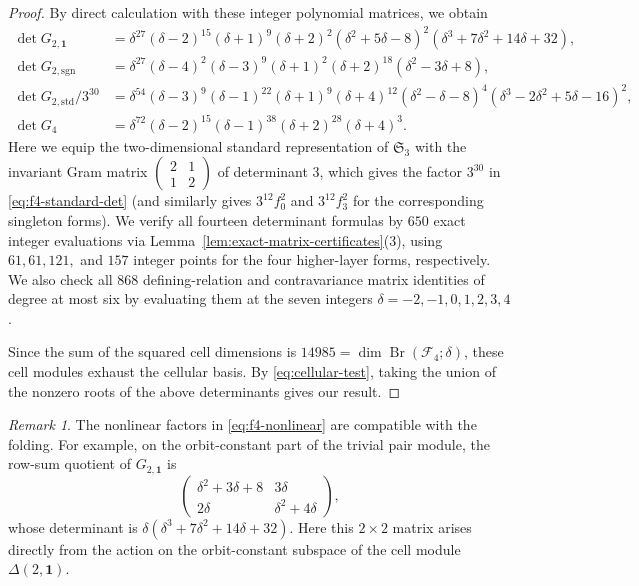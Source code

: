 \documentclass[11pt,a4paper]{amsart}
\newcommand{\Br}{\operatorname{Br}}\newcommand{\Irr}{\operatorname{Irr}}
\theoremstyle{uprightdefinition}
\theoremstyle{remark}\newtheorem{remark}[theorem]{Remark}
\begin{document}
\begin{proof}
By direct calculation with these integer polynomial matrices, we obtain
\begin{align}
\det G_{2,\mathbf1}
 &=\delta^{27}(\delta-2)^{15}(\delta+1)^9(\delta+2)^2
       (\delta^2+5\delta-8)^2
       (\delta^3+7\delta^2+14\delta+32),\label{eq:f4-trivial-det}\\
\det G_{2,\mathrm{sgn}}
 &=\delta^{27}(\delta-4)^2(\delta-3)^9(\delta+1)^2
       (\delta+2)^{18}(\delta^2-3\delta+8),\label{eq:f4-sign-det}\\
\det G_{2,\mathrm{std}}/3^{30}
 &=\delta^{54}(\delta-3)^9(\delta-1)^{22}(\delta+1)^9(\delta+4)^{12}
       (\delta^2-\delta-8)^4
       (\delta^3-2\delta^2+5\delta-16)^2,\label{eq:f4-standard-det}\\
\det G_4
 &=\delta^{72}(\delta-2)^{15}(\delta-1)^{38}
       (\delta+2)^{28}(\delta+4)^3.\label{eq:f4-four-det}
\end{align}
Here we equip the two-dimensional standard representation of $\mathfrak S_3$ with the invariant Gram matrix
$\left(\begin{smallmatrix}2&1\\1&2\end{smallmatrix}\right)$ of determinant $3$, which gives the factor $3^{30}$ in \eqref{eq:f4-standard-det} (and similarly gives $3^{12}f_0^2$ and
$3^{12}f_3^2$ for the corresponding singleton forms). We verify all fourteen determinant formulas
by $650$ exact integer evaluations via
Lemma~\ref{lem:exact-matrix-certificates}(3), using $61,61,121,$ and $157$ integer points for the four higher-layer
forms, respectively.
We also check all $868$ defining-relation and
contravariance matrix identities of degree at most six by evaluating them at the seven integers $\delta=-2,-1,0,1,2,3,4$.

Since the sum of the squared cell dimensions is $14985=\dim\Br(\mathscr{F}_4;\delta)$, these cell modules exhaust the cellular basis. By \eqref{eq:cellular-test}, taking the
union of the nonzero roots of the above determinants gives our result.
\end{proof}

\begin{remark}
The nonlinear factors in \eqref{eq:f4-nonlinear} are compatible with the
folding. For example, on the orbit-constant part of the trivial pair module,
the row-sum quotient of $G_{2,\mathbf1}$ is
\[
 \begin{pmatrix}
 \delta^2+3\delta+8&3\delta\\
 2\delta&\delta^2+4\delta
 \end{pmatrix},
\]
whose determinant is
$\delta(\delta^3+7\delta^2+14\delta+32)$.
Here this $2\times2$ matrix arises directly from the action on the orbit-constant subspace of the cell module $\Delta(2,\mathbf1)$.
\end{remark}
\end{document}
